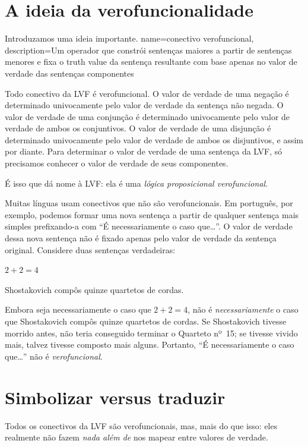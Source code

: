 \section{A ideia da verofuncionalidade}
Introduzamos uma ideia importante.
{
name=conectivo verofuncional,
description={Um operador que constrói sentenças maiores a partir de sentenças menores e fixa o \gls{truth value} da sentença resultante com base apenas no valor de verdade das sentenças componentes}
}
        
Todo conectivo da LVF é verofuncional. O valor de verdade de uma negação é determinado univocamente pelo valor de verdade da sentença não negada. O valor de verdade de uma conjunção é determinado univocamente pelo valor de verdade de ambos os conjuntivos. O valor de verdade de uma disjunção é determinado univocamente pelo valor de verdade de ambos os disjuntivos, e assim por diante. Para determinar o valor de verdade de uma sentença da LVF, só precisamos conhecer o valor de verdade de seus componentes.

É isso que dá nome à LVF: ela é uma \emph{lógica proposicional verofuncional}.

Muitas línguas usam conectivos que não são verofuncionais. Em português, por exemplo, podemos formar uma nova sentença a partir de qualquer sentença mais simples prefixando-a com \textquotedblleft{}É necessariamente o caso que\ldots\textquotedblright{}. O valor de verdade dessa nova sentença não é fixado apenas pelo valor de verdade da sentença original. Considere duas sentenças verdadeiras:
	\begin{compactlist}
		\item $2 + 2 = 4$
		\item Shostakovich compôs quinze quartetos de cordas.
	\end{compactlist}
Embora seja necessariamente o caso que $2 + 2 = 4$, não é \emph{necessariamente} o caso que Shostakovich compôs quinze quartetos de cordas. Se Shostakovich tivesse morrido antes, não teria conseguido terminar o Quarteto nº~15; se tivesse vivido mais, talvez tivesse composto mais alguns. Portanto, \textquotedblleft{}É necessariamente o caso que\ldots\textquotedblright{} não é \emph{verofuncional}.

\section{Simbolizar versus traduzir}
Todos os conectivos da LVF são verofuncionais, mas, mais do que isso: eles realmente não fazem \emph{nada além de} nos mapear entre valores de verdade.

